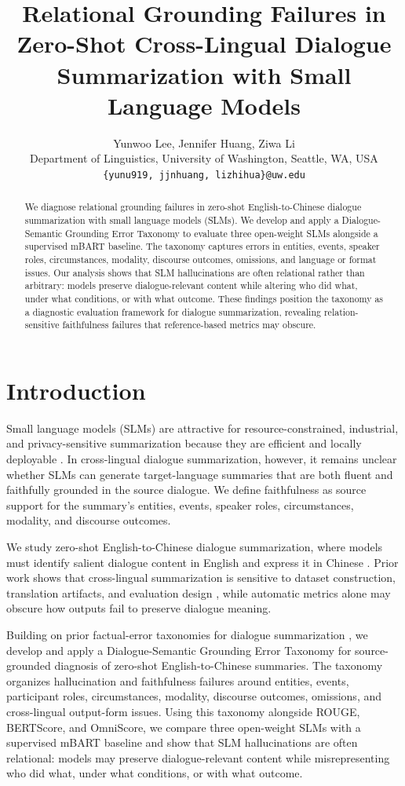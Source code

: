 \documentclass[11pt]{article}
\title{Relational Grounding Failures in Zero-Shot Cross-Lingual Dialogue Summarization with Small Language Models}
\author{
Yunwoo Lee, Jennifer Huang, Ziwa Li \\
Department of Linguistics, University of Washington, Seattle, WA, USA \\
\texttt{\{yunu919, jjnhuang, lizhihua\}@uw.edu}
}
\begin{document}
\maketitle
\raggedbottom
\begin{abstract}
We diagnose relational grounding failures in zero-shot English-to-Chinese dialogue summarization with small language models (SLMs). We develop and apply a Dialogue-Semantic Grounding Error Taxonomy to evaluate three open-weight SLMs alongside a supervised mBART baseline. The taxonomy captures errors in entities, events, speaker roles, circumstances, modality, discourse outcomes, omissions, and language or format issues. Our analysis shows that SLM hallucinations are often relational rather than arbitrary: models preserve dialogue-relevant content while altering who did what, under what conditions, or with what outcome. These findings position the taxonomy as a diagnostic evaluation framework for dialogue summarization, revealing relation-sensitive faithfulness failures that reference-based metrics may obscure.
\end{abstract}


\section{Introduction}
Small language models (SLMs) are attractive for resource-constrained, industrial, and privacy-sensitive summarization because they are efficient and locally deployable \citep{abrougui-etal-2026-small,xu-etal-2025-evaluating,philippy-etal-2025-enhancing}. In cross-lingual dialogue summarization, however, it remains unclear whether SLMs can generate target-language summaries that are both fluent and faithfully grounded in the source dialogue. We define faithfulness as source support for the summary's entities, events, speaker roles, circumstances, modality, and discourse outcomes.

We study zero-shot English-to-Chinese dialogue summarization, where models must identify salient dialogue content in English and express it in Chinese \citep{wang-etal-2022-clidsum,wang-etal-2023-zero}. Prior work shows that cross-lingual summarization is sensitive to dataset construction, translation artifacts, and evaluation design \citep{bhattacharjee-etal-2023-crosssum,wang-etal-2023-understanding}, while automatic metrics alone may obscure how outputs fail to preserve dialogue meaning.

Building on prior factual-error taxonomies for dialogue summarization \citep{tang-etal-2022-confit,wang-etal-2022-analyzing}, we develop and apply a Dialogue-Semantic Grounding Error Taxonomy for source-grounded diagnosis of zero-shot English-to-Chinese summaries. The taxonomy organizes hallucination and faithfulness failures around entities, events, participant roles, circumstances, modality, discourse outcomes, omissions, and cross-lingual output-form issues. Using this taxonomy alongside ROUGE, BERTScore, and OmniScore, we compare three open-weight SLMs with a supervised mBART baseline and show that SLM hallucinations are often relational: models may preserve dialogue-relevant content while misrepresenting who did what, under what conditions, or with what outcome.
\end{document}
